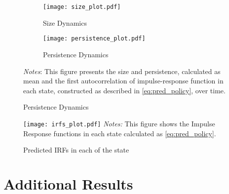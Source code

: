 \documentclass[12pt]{article}
\numberwithin{equation}{section}
\begin{document}
\begin{figure}[!htbp]\centering
  \caption{Size and Persistence Dynamics}
  \vspace{2ex}
  \label{fig:Size_Persistence_Dynamics}
  \begin{subfigure}[b]{0.495\textwidth}
      \centering
      \caption{Size Dynamics}
      \label{fig:AverageResponce}
      \texttt{[image: size\_plot.pdf]}
  \end{subfigure}
  \hfill
  \begin{subfigure}[b]{0.495\textwidth}
      \centering
      \caption{Persistence Dynamics}
      \label{fig:DifferentialResponce}
      \texttt{[image: persistence\_plot.pdf]}
  \end{subfigure}
      {\begin{flushleft}\scriptsize\textit{Notes}: This figure presents the size and persistence, calculated as mean and the first autocorrelation of impulse-response function in each state, constructed as described in \vref{eq:pred_policy}, over time. \end{flushleft}}
\end{figure}


\begin{figure}[!htbp]\centering
  \begin{minipage}{0.8\textwidth}
    \caption{Predicted IRFs in each of the state} 
    \label{fig:predicted_IRF}
    \texttt{[image: irfs\_plot.pdf]}
    {\raggedleft\scriptsize \textit{Notes:} This figure shows the Impulse Response functions in each state calculated as \vref{eq:pred_policy}.} 
    \end{minipage}

\end{figure}




\newpage
{}
\newpage
\appendix
{}

\section{Additional Results}
\end{document}
